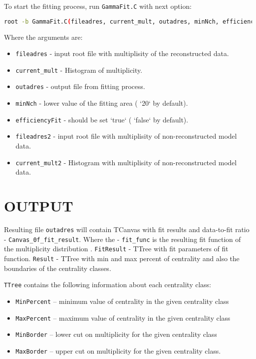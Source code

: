 \documentclass[11pt]{article}
\begin{document}
To start the fitting process, run \texttt{GammaFit.C} with next option:
\begin{lstlisting}[language=bash,caption={}]
 root -b GammaFit.C(fileadres, current_mult, outadres, minNch, efficiencyFit,fileadres2, current_mult2)
\end{lstlisting}
Where the arguments are:

\begin{itemize}
\item \texttt{fileadres} - input root file with multiplisity of the reconstructed data.
\item \texttt{current\_mult} - Histogram of multiplicity.
\item \texttt{outadres} - output file from fitting process.
\item \texttt{minNch} - lower value of the fitting area ( `20` by default).
\item \texttt{efficiencyFit} - should be set `true` ( `false` by default).
\item \texttt{fileadres2} - input root file with multiplisity of non-reconstructed model data.
\item \texttt{current\_mult2} - Histogram with multiplisity of non-reconstructed model data.
\end{itemize}
\section{OUTPUT}
Resulting file \texttt{outadres} will contain TCanvas with fit results and data-to-fit ratio - \texttt{Canvas\_0f\_fit\_result}.
Where the - \texttt{fit\_func} is the resulting fit function of the multiplicity distribution .
\texttt{FitResult} - TTree with fit parameters of fit function.
\texttt{Result} - TTree with min and max percent of centrality and also the boundaries of the centrality classes.

\texttt{TTree} contains the following information about each centrality class:
\begin{itemize}
    \item \texttt{MinPercent} -- minimum value of centrality in the given centrality class
    \item \texttt{MaxPercent} -- maximum value of centrality in the given centrality class
    \item \texttt{MinBorder} -- lower cut on multiplicity for the given centrality class
    \item \texttt{MaxBorder} -- upper cut on multiplicity for the given centrality class.
\end{itemize}
\end{document}
